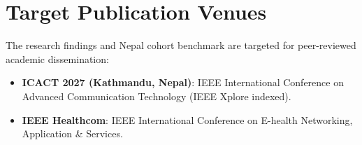 \section{Target Publication Venues}

The research findings and Nepal cohort benchmark are targeted for peer-reviewed academic dissemination:
\begin{itemize}
    \item \textbf{ICACT 2027 (Kathmandu, Nepal)}: IEEE International Conference on Advanced Communication Technology (IEEE Xplore indexed).
    \item \textbf{IEEE Healthcom}: IEEE International Conference on E-health Networking, Application \& Services.
\end{itemize}